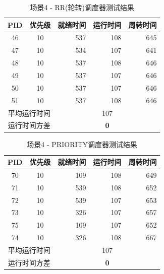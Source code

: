 \documentclass[a4paper, 12pt]{article}
\begin{document}
\begin{table}[H]
	\centering
	\caption{场景4 - RR(轮转)调度器测试结果}
	\begin{tabular}{ccrrr}
		\toprule
		\textbf{PID} & \textbf{优先级} & \textbf{就绪时间} & \textbf{运行时间} & \textbf{周转时间} \\
		\midrule
		46 & 10 & 537 & 108 & 645 \\
		47 & 10 & 534 & 107 & 641 \\
		48 & 10 & 537 & 108 & 646 \\
		49 & 10 & 537 & 107 & 646 \\
		50 & 10 & 537 & 107 & 646 \\
		51 & 10 & 537 & 108 & 646 \\
		\midrule
		\multicolumn{2}{c}{平均运行时间} & \multicolumn{3}{c}{107} \\
		\multicolumn{2}{c}{运行时间方差} & \multicolumn{3}{c}{\textbf{0}} \\
		\bottomrule
	\end{tabular}
\end{table}

\begin{table}[H]
	\centering
	\caption{场景4 - PRIORITY调度器测试结果}
	\begin{tabular}{ccrrr}
		\toprule
		\textbf{PID} & \textbf{优先级} & \textbf{就绪时间} & \textbf{运行时间} & \textbf{周转时间} \\
		\midrule
		70 & 10 & 109 & 108 & 649 \\
		71 & 10 & 539 & 108 & 652 \\
		72 & 10 & 539 & 107 & 653 \\
		73 & 10 & 326 & 107 & 657 \\
		75 & 10 & 109 & 107 & 652 \\
		74 & 10 & 326 & 108 & 667 \\
		\midrule
		\multicolumn{2}{c}{平均运行时间} & \multicolumn{3}{c}{107} \\
		\multicolumn{2}{c}{运行时间方差} & \multicolumn{3}{c}{\textbf{0}} \\
		\bottomrule
	\end{tabular}
\end{table}
\end{document}

